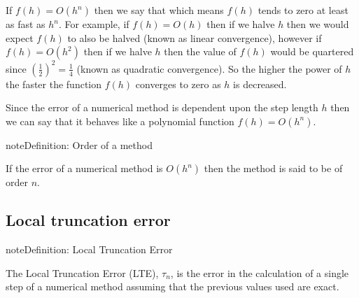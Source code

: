 \documentclass[letterpaper,10pt,english]{jupyterBook}
\begin{document}
\sphinxAtStartPar
If \(f(h) = O(h^n)\) then we say that  which means \(f(h)\) tends to zero at least as fast as \(h^n\). For example, if \(f(h) = O(h)\) then if we halve \(h\) then we would expect \(f(h)\) to also be halved (known as linear convergence), however if \(f(h) = O(h^2)\) then if we halve \(h\) then the value of \(f(h)\) would be quartered since \((\frac{1}{2})^2 = \frac{1}{4}\) (known as quadratic convergence). So the higher the power of \(h\) the faster the function \(f(h)\) converges to zero as \(h\) is decreased.

\sphinxAtStartPar
Since the error of a numerical method is dependent upon the step length \(h\) then we can say that it behaves like a polynomial function \(f(h) = O(h^n)\).

\begin{sphinxadmonition}{note}{Definition: Order of a method}

\sphinxAtStartPar
If the error of a numerical method is \(O(h^n)\) then the method is said to be of order \(n\).
\end{sphinxadmonition}


\subsection{Local truncation error}
\label{\detokenize{1_IVPs/1.3_Error_Analysis:local-truncation-error}}\label{\detokenize{1_IVPs/1.3_Error_Analysis:local-truncation-error-section}}
\begin{sphinxadmonition}{note}{Definition: Local Truncation Error}

\sphinxAtStartPar
The Local Truncation Error (LTE), \(\tau_n\), is the error in the calculation of a single step of a numerical method assuming that the previous values used are exact.
\end{sphinxadmonition}
\end{document}

